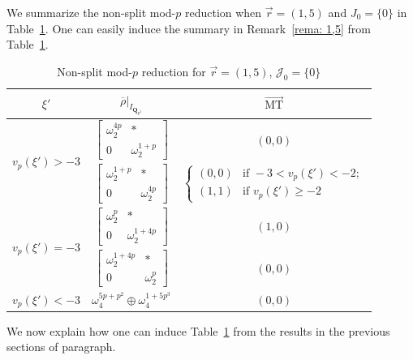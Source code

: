 \documentclass[11pt]{amsart}
\theoremstyle{definition}
\numberwithin{equation}{subsection}
\theoremstyle{plain}
\theoremstyle{plain}
\theoremstyle{plain}
\theoremstyle{plain}
\theoremstyle{plain}
\theoremstyle{plain}
\theoremstyle{plain}
\theoremstyle{plain}
\theoremstyle{plain}
\theoremstyle{plain}
\theoremstyle{plain}
\theoremstyle{plain}
\theoremstyle{definition}
\theoremstyle{definition}
\theoremstyle{definition}
\theoremstyle{remark}
\renewcommand{\(}{\textup{(}}
\renewcommand{\)}{\textup{)}}
\newcommand{\Q}{\mathbf{Q}}
\newcommand{\rhobar}{\overline{\rho}}
\newcommand{\cJ}{\mathcal{J}}
\newcommand{\vr}{\vec{r}}
\newcommand{\IQptwo}{{I_{\Q_{p^2}}}}
\begin{document}
We summarize the non-split mod-$p$ reduction when $\vr=(1,5)$ and $J_0=\{0\}$ in Table~\ref{tab:summary for vr=(1,5), cJ={0}}. One can easily induce the summary in Remark~\ref{rema: 1,5} from Table~\ref{tab:summary for vr=(1,5), cJ={0}}.
\begin{table}[htbp]
    \centering
    \begin{tabular}{|c||c|c|}
    \hline
        $\xi'$ & $\rhobar|_\IQptwo$ & $\vec{\mathrm{MT}}$ \\\hline\hline
        \multirow{2}{*}[-1.5ex]{$v_p(\xi')>-3$}
            & $
            \begin{bmatrix}
                \omega_2^{4p} & * \\ 0 & \omega_2^{1+p}
            \end{bmatrix}$
            & $(0,0)$\\\cline{2-3}
            & $
            \begin{bmatrix}
                \omega_2^{1+p} & * \\ 0 & \omega_2^{4p}
            \end{bmatrix}$
            & $
            \begin{cases}
                (0,0) &\mbox{if }-3<v_p(\xi')<-2; \\
                (1,1) &\mbox{if }v_p(\xi')\geq -2 
            \end{cases}$  \\\hline
        \multirow{2}{*}[-1.5ex]{$v_p(\xi')=-3$}
            & $
            \begin{bmatrix}
                \omega_2^p & * \\ 0 & \omega_2^{1+4p}
            \end{bmatrix}$
            & $(1,0)$\\\cline{2-3}
            & $
            \begin{bmatrix}
                \omega_2^{1+4p} & * \\ 0 & \omega_2^p
            \end{bmatrix}$
            & $(0,0)$ \\\hline
        $v_p(\xi')<-3$
            & $\omega_4^{5p+p^2}\oplus\omega_4^{1+5p^3}$
            & $(0,0)$ \\
        \hline
    \end{tabular}
    \caption{Non-split mod-$p$ reduction for $\vr=(1,5)$, $\cJ_0=\{0\}$}
    \label{tab:summary for vr=(1,5), cJ={0}}
\end{table}
We now explain how one can induce Table~\ref{tab:summary for vr=(1,5), cJ={0}} from the results in the previous sections of paragraph.
\end{document}
